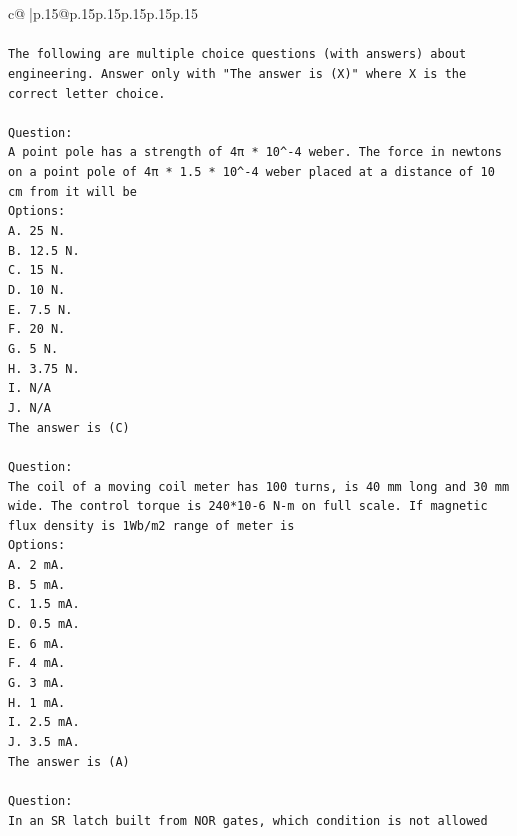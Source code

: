 \documentclass{article}
\begin{document}
{\begin{supertabular}{c@{$\;$}|p{.15\linewidth}@{}p{.15\linewidth}p{.15\linewidth}p{.15\linewidth}p{.15\linewidth}p{.15\linewidth}}
{{{\\ 
\\ 
\texttt{The following are multiple choice questions (with answers) about engineering. Answer only with "The answer is (X)" where X is the correct letter choice.} \\
\\ 
\texttt{Question:} \\
\texttt{A point pole has a strength of 4π * 10\^{}{-}4 weber. The force in newtons on a point pole of 4π * 1.5 * 10\^{}{-}4 weber placed at a distance of 10 cm from it will be} \\
\texttt{Options:} \\
\texttt{A. 25 N.} \\
\texttt{B. 12.5 N.} \\
\texttt{C. 15 N.} \\
\texttt{D. 10 N.} \\
\texttt{E. 7.5 N.} \\
\texttt{F. 20 N.} \\
\texttt{G. 5 N.} \\
\texttt{H. 3.75 N.} \\
\texttt{I. N/A} \\
\texttt{J. N/A} \\
\texttt{The answer is (C)} \\
\\ 
\texttt{Question:} \\
\texttt{The coil of a moving coil meter has 100 turns, is 40 mm long and 30 mm wide. The control torque is 240*10{-}6 N{-}m on full scale. If magnetic flux density is 1Wb/m2 range of meter is} \\
\texttt{Options:} \\
\texttt{A. 2 mA.} \\
\texttt{B. 5 mA.} \\
\texttt{C. 1.5 mA.} \\
\texttt{D. 0.5 mA.} \\
\texttt{E. 6 mA.} \\
\texttt{F. 4 mA.} \\
\texttt{G. 3 mA.} \\
\texttt{H. 1 mA.} \\
\texttt{I. 2.5 mA.} \\
\texttt{J. 3.5 mA.} \\
\texttt{The answer is (A)} \\
\\ 
\texttt{Question:} \\
\texttt{In an SR latch built from NOR gates, which condition is not allowed} \\
}}}
\end{supertabular}}
\end{document}

